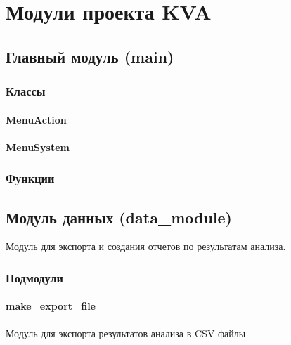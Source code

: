 \documentclass[a4paper,11pt,russian,openany,oneside]{sphinxmanual}
\begin{document}
\sphinxstepscope


\section{Модули проекта KVA}
\label{\detokenize{modules:kva}}\label{\detokenize{modules::doc}}
\sphinxstepscope


\subsection{Главный модуль (main)}
\label{\detokenize{main:main}}\label{\detokenize{main::doc}}

\subsubsection{Классы}
\label{\detokenize{main:id1}}

\paragraph{MenuAction}
\label{\detokenize{main:menuaction}}

\paragraph{MenuSystem}
\label{\detokenize{main:menusystem}}

\subsubsection{Функции}
\label{\detokenize{main:id2}}
\sphinxstepscope


\subsection{Модуль данных (data\_module)}
\label{\detokenize{data_module:data-module}}\label{\detokenize{data_module::doc}}
\sphinxAtStartPar
Модуль для экспорта и создания отчетов по результатам анализа.

\subsubsection{Подмодули}
\label{\detokenize{data_module:module-data_module}}\label{\detokenize{data_module:id1}}

\paragraph{make\_export\_file}
\label{\detokenize{data_module:module-data_module.make_export_file}}\label{\detokenize{data_module:make-export-file}}
\sphinxAtStartPar
Модуль для экспорта результатов анализа в CSV файлы
\end{document}

